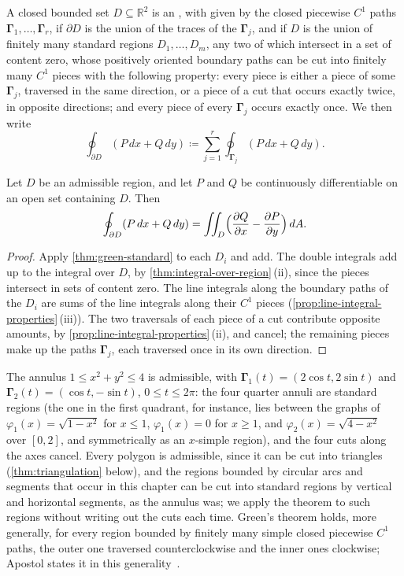 \begin{definition}
\label{def:admissible-region}
A closed bounded set $D\subseteq\mathbb R^2$ is an , with  given by the closed piecewise $C^1$ paths $\boldsymbol\Gamma_1,\ldots,\boldsymbol\Gamma_r$, if $\partial D$ is the union of the traces of the $\boldsymbol\Gamma_j$, and if $D$ is the union of finitely many standard regions $D_1,\ldots,D_m$, any two of which intersect in a set of content zero, whose positively oriented boundary paths can be cut into finitely many $C^1$ pieces with the following property: every piece is either a piece of some $\boldsymbol\Gamma_j$, traversed in the same direction, or a piece of a cut that occurs exactly twice, in opposite directions; and every piece of every $\boldsymbol\Gamma_j$ occurs exactly once. We then write
\[
\oint_{\partial D}(P\,dx+Q\,dy)\coloneqq\sum_{j=1}^r\oint_{\boldsymbol\Gamma_j}(P\,dx+Q\,dy).
\]
\end{definition}

\begin{theorem}
\label{thm:green}
Let $D$ be an admissible region, and let $P$ and $Q$ be continuously differentiable on an open set containing $D$. Then
\[
\oint_{\partial D}(P\,dx+Q\,dy)=\iint_D\Bigl(\frac{\partial Q}{\partial x}-\frac{\partial P}{\partial y}\Bigr)\,dA .
\]
\end{theorem}

\begin{proof}
Apply \cref{thm:green-standard} to each $D_i$ and add. The double integrals add up to the integral over $D$, by \cref{thm:integral-over-region}\,(ii), since the pieces intersect in sets of content zero. The line integrals along the boundary paths of the $D_i$ are sums of the line integrals along their $C^1$ pieces (\cref{prop:line-integral-properties}\,(iii)). The two traversals of each piece of a cut contribute opposite amounts, by \cref{prop:line-integral-properties}\,(ii), and cancel; the remaining pieces make up the paths $\boldsymbol\Gamma_j$, each traversed once in its own direction.
\end{proof}

The annulus $1\le x^2+y^2\le4$ is admissible, with $\boldsymbol\Gamma_1(t)=(2\cos t,2\sin t)$ and $\boldsymbol\Gamma_2(t)=(\cos t,-\sin t)$, $0\le t\le2\pi$: the four quarter annuli are standard regions (the one in the first quadrant, for instance, lies between the graphs of $\varphi_1(x)=\sqrt{1-x^2}$ for $x\le1$, $\varphi_1(x)=0$ for $x\ge1$, and $\varphi_2(x)=\sqrt{4-x^2}$ over $[0,2]$, and symmetrically as an $x$-simple region), and the four cuts along the axes cancel. Every polygon is admissible, since it can be cut into triangles (\cref{thm:triangulation} below), and the regions bounded by circular arcs and segments that occur in this chapter can be cut into standard regions by vertical and horizontal segments, as the annulus was; we apply the theorem to such regions without writing out the cuts each time. Green's theorem holds, more generally, for every region bounded by finitely many simple closed piecewise $C^1$ paths, the outer one traversed counterclockwise and the inner ones clockwise; Apostol states it in this generality~\cite{apostol1969calculus}.

